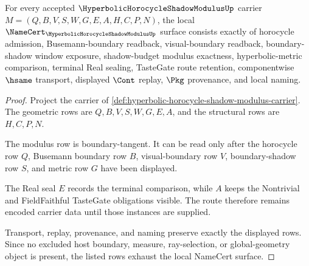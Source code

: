 \begin{theorem}
\label{thm:hyperbolic-horocycle-shadow-modulus-namecert-obligations}
For every accepted $\HyperbolicHorocycleShadowModulusUp$ carrier $M=(Q,B,V,S,W,G,E,A,H,C,P,N)$, the local $\NameCert_{\HyperbolicHorocycleShadowModulusUp}$ surface consists exactly of horocycle admission, Busemann-boundary readback, visual-boundary readback, boundary-shadow window exposure, shadow-budget modulus exactness, hyperbolic-metric comparison, terminal Real sealing, TasteGate route retention, componentwise $\hsame$ transport, displayed $\Cont$ replay, $\Pkg$ provenance, and local naming.
\end{theorem}
\begin{proof}
Project the carrier of \autoref{def:hyperbolic-horocycle-shadow-modulus-carrier}. The geometric rows are $Q,B,V,S,W,G,E,A$, and the structural rows are $H,C,P,N$.

The modulus row is boundary-tangent. It can be read only after the horocycle row $Q$, Busemann boundary row $B$, visual-boundary row $V$, boundary-shadow row $S$, and metric row $G$ have been displayed.

The Real seal $E$ records the terminal comparison, while $A$ keeps the Nontrivial and FieldFaithful TasteGate obligations visible. The route therefore remains encoded carrier data until those instances are supplied.

Transport, replay, provenance, and naming preserve exactly the displayed rows. Since no excluded host boundary, measure, ray-selection, or global-geometry object is present, the listed rows exhaust the local NameCert surface.
\end{proof}

